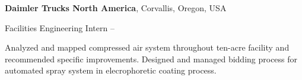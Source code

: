 \documentclass[letterpaper,MMMyyyy,nonstopmode]{simpleresumecv}
\begin{document}
\begin{Body}
\Entry
\textbf{Daimler Trucks North America},
Corvallis, Oregon, USA

\BulletItem
Facilities Engineering Intern
\hfill
{} -- 

\begin{Detail}
\SubBulletItem
Analyzed and mapped compressed air system throughout ten-acre facility and recommended specific improvements.
\SubBulletItem
Designed and managed bidding process for automated spray system in elecrophoretic coating process.
\end{Detail}





\end{Body}
\end{document}
